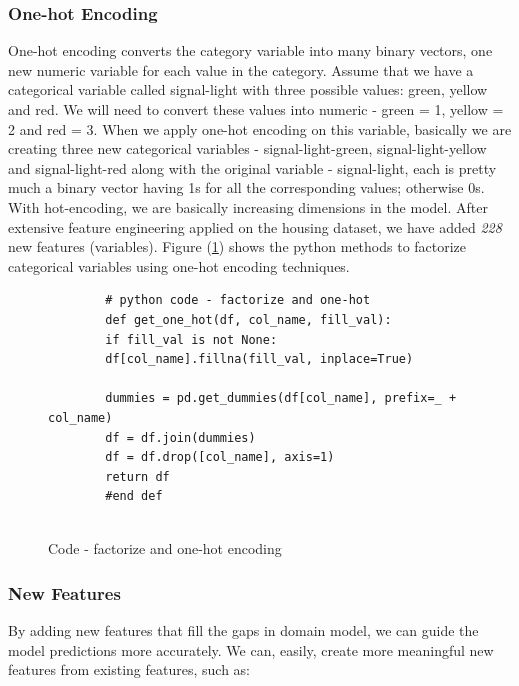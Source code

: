 \documentclass[sigconf]{acmart}
\begin{document}
	\subsubsection{One-hot Encoding}
	One-hot encoding converts the category variable into many binary vectors, one new numeric variable for each value in the category. Assume that we have a categorical variable called signal-light with three possible values: green, yellow and red. We will need to convert these values into numeric - green = 1, yellow = 2 and red = 3. When we apply one-hot encoding on this variable, basically we are creating three new categorical variables - signal-light-green, signal-light-yellow and signal-light-red along with the original variable - signal-light, each is pretty much a binary vector having 1s for all the corresponding values; otherwise 0s. With hot-encoding, we are basically increasing dimensions in the model. After extensive feature engineering applied on the housing dataset, we have added {\em 228} new features (variables). Figure (\ref{c:code-one-hot}) shows the python methods to factorize categorical variables using one-hot encoding techniques. 
	
	\begin{figure}[htb]	
		\begin{verbatim}	
		# python code - factorize and one-hot
		def get_one_hot(df, col_name, fill_val):
		if fill_val is not None:
		df[col_name].fillna(fill_val, inplace=True)
		
		dummies = pd.get_dummies(df[col_name], prefix=_ + col_name)
		df = df.join(dummies)
		df = df.drop([col_name], axis=1)
		return df
		#end def	
		
		\end{verbatim}
		\caption{Code - factorize and one-hot encoding} \label{c:code-one-hot} 
	\end{figure}
	
	\subsubsection{New Features}
	By adding new features that fill the gaps in domain model, we can guide the model predictions more accurately. We can, easily, create more meaningful new features from existing features, such as:
	
\end{document}
